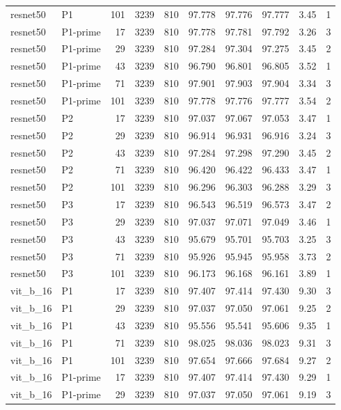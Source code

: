 \begin{longtable}{p{2.25cm}p{1.1cm}rrrrrrrr}
resnet50 & P1 & 101 & 3239 & 810 & 97.778 & 97.776 & 97.777 & 3.45 & 1 \\ 
resnet50 & P1-prime & 17 & 3239 & 810 & 97.778 & 97.781 & 97.792 & 3.26 & 3 \\ 
resnet50 & P1-prime & 29 & 3239 & 810 & 97.284 & 97.304 & 97.275 & 3.45 & 2 \\ 
resnet50 & P1-prime & 43 & 3239 & 810 & 96.790 & 96.801 & 96.805 & 3.52 & 1 \\ 
resnet50 & P1-prime & 71 & 3239 & 810 & 97.901 & 97.903 & 97.904 & 3.34 & 3 \\ 
resnet50 & P1-prime & 101 & 3239 & 810 & 97.778 & 97.776 & 97.777 & 3.54 & 2 \\ 
resnet50 & P2 & 17 & 3239 & 810 & 97.037 & 97.067 & 97.053 & 3.47 & 1 \\ 
resnet50 & P2 & 29 & 3239 & 810 & 96.914 & 96.931 & 96.916 & 3.24 & 3 \\ 
resnet50 & P2 & 43 & 3239 & 810 & 97.284 & 97.298 & 97.290 & 3.45 & 2 \\ 
resnet50 & P2 & 71 & 3239 & 810 & 96.420 & 96.422 & 96.433 & 3.47 & 1 \\ 
resnet50 & P2 & 101 & 3239 & 810 & 96.296 & 96.303 & 96.288 & 3.29 & 3 \\ 
resnet50 & P3 & 17 & 3239 & 810 & 96.543 & 96.519 & 96.573 & 3.47 & 2 \\ 
resnet50 & P3 & 29 & 3239 & 810 & 97.037 & 97.071 & 97.049 & 3.46 & 1 \\ 
resnet50 & P3 & 43 & 3239 & 810 & 95.679 & 95.701 & 95.703 & 3.25 & 3 \\ 
resnet50 & P3 & 71 & 3239 & 810 & 95.926 & 95.945 & 95.958 & 3.73 & 2 \\ 
resnet50 & P3 & 101 & 3239 & 810 & 96.173 & 96.168 & 96.161 & 3.89 & 1 \\ 
vit\_b\_16 & P1 & 17 & 3239 & 810 & 97.407 & 97.414 & 97.430 & 9.30 & 3 \\ 
vit\_b\_16 & P1 & 29 & 3239 & 810 & 97.037 & 97.050 & 97.061 & 9.25 & 2 \\ 
vit\_b\_16 & P1 & 43 & 3239 & 810 & 95.556 & 95.541 & 95.606 & 9.35 & 1 \\ 
vit\_b\_16 & P1 & 71 & 3239 & 810 & 98.025 & 98.036 & 98.023 & 9.31 & 3 \\ 
vit\_b\_16 & P1 & 101 & 3239 & 810 & 97.654 & 97.666 & 97.684 & 9.27 & 2 \\ 
vit\_b\_16 & P1-prime & 17 & 3239 & 810 & 97.407 & 97.414 & 97.430 & 9.29 & 1 \\ 
vit\_b\_16 & P1-prime & 29 & 3239 & 810 & 97.037 & 97.050 & 97.061 & 9.19 & 3 \\ 

\end{longtable}
